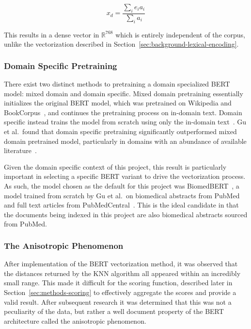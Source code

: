 \documentclass[11pt]{article}
\theoremstyle{plain}
\theoremstyle{definition}
\begin{document}
\begin{equation}\label{eq:dense-vector}
    x_d = \frac{\sum_{i} {e_i}{a_i}}{\sum_{i} a_i}
\end{equation}

This results in a dense vector in $\mathbb{R}^{768}$ which is entirely independent of the corpus, unlike the vectorization described in Section~\ref{sec:background-lexical-encoding}.

\subsubsection{Domain Specific Pretraining}\label{sec:background-contextual-domain}

There exist two distinct methods to pretraining a domain specialized BERT model: mixed domain and domain specific. Mixed domain pretraining essentially initializes the original BERT model, which was pretrained on Wikipedia and BookCorpus~\cite{devlin/2018/bert}, and continues the pretraining process on in-domain text. Domain specific instead trains the model from scratch using only the in-domain text~\cite{gu/2021/domainspecific}.  Gu et al.\ found that domain specific pretraining significantly outperformed mixed domain pretrained model, particularly in domains with an abundance of available literature~\cite{gu/2021/domainspecific}.

Given the domain specific context of this project, this result is particularly important in selecting a specific BERT variant to drive the vectorization process. As such, the model chosen as the default for this project was BiomedBERT~\cite{gu/2021/domainspecific}, a model trained from scratch by Gu et al.\ on biomedical abstracts from PubMed and full text articles from PubMedCentral~\cite{sayers/2024/database}. This is the ideal candidate in that the documents being indexed in this project are also biomedical abstracts sourced from PubMed.

\subsubsection{The Anisotropic Phenomenon}\label{sec:background-contextual-anisotropy}

After implementation of the BERT vectorization method, it was observed that the distances returned by the KNN algorithm all appeared within an incredibly small range. This made it difficult for the scoring function, described later in Section~\ref{sec:methods-scoring} to effectively aggregate the scores and provide a valid result. After subsequent research it was determined that this was not a peculiarity of the data, but rather a well document property of the BERT architecture called the anisotropic phenomenon.
\end{document}
